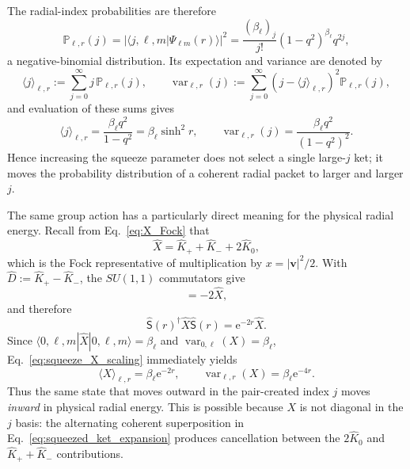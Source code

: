 \documentclass[11pt]{article}
\numberwithin{equation}{section}
\newcommand{\e}{\mathrm e}
\theoremstyle{definition}
\begin{document}
The radial-index probabilities are therefore
\begin{equation}
 \mathbb P_{\ell,r}(j)
 =|\langle j,\ell,m|\Psi_{\ell m}(r)\rangle|^2
 =\frac{(\beta_\ell)_j}{j!}
 (1-q^2)^{\beta_\ell}q^{2j},
 \label{eq:trial_negative_binomial}
\end{equation}
a negative-binomial distribution.  Its expectation and variance are denoted
by
\begin{equation}
 \langle j\rangle_{\ell,r}
 :=\sum_{j=0}^\infty j\,\mathbb P_{\ell,r}(j),
 \qquad
 \operatorname{var}_{\ell,r}(j)
 :=\sum_{j=0}^\infty
 (j-\langle j\rangle_{\ell,r})^2\mathbb P_{\ell,r}(j),
 \label{eq:squeezed_j_moment_definitions}
\end{equation}
and evaluation of these sums gives
\begin{equation}
 \langle j\rangle_{\ell,r}
 =\frac{\beta_\ell q^2}{1-q^2}
 =\beta_\ell\sinh^2 r,
 \qquad
 \operatorname{var}_{\ell,r}(j)
 =\frac{\beta_\ell q^2}{(1-q^2)^2}.
 \label{eq:squeezed_j_moments}
\end{equation}
Hence increasing the squeeze parameter does not select a single large-$j$
ket; it moves the probability distribution of a coherent radial packet to
larger and larger $j$.

The same group action has a particularly direct meaning for the physical
radial energy.  Recall from Eq.~\eqref{eq:X_Fock} that
\begin{equation}
 \widehat X
 =\widehat K_++\widehat K_-+2\widehat K_0,
 \end{equation}
which is the Fock representative of multiplication by $x=|\bm v|^2/2$.
With $\widehat D:=\widehat K_+-\widehat K_-$, the $SU(1,1)$ commutators give
\begin{equation}
 [\widehat D,\widehat X]=-2\widehat X,
\end{equation}
and therefore
\begin{equation}
 \widehat{\mathsf S}(r)^\dagger\widehat X\widehat{\mathsf S}(r)
 =\e^{-2r}\widehat X .
 \label{eq:squeeze_X_scaling}
\end{equation}
Since
$\langle0,\ell,m|\widehat X|0,\ell,m\rangle=\beta_\ell$ and
$\operatorname{var}_{0,\ell}(X)=\beta_\ell$, Eq.~\eqref{eq:squeeze_X_scaling}
immediately yields
\begin{equation}
 \boxed{
 \langle X\rangle_{\ell,r}
 =\beta_\ell\e^{-2r},
 \qquad
 \operatorname{var}_{\ell,r}(X)
 =\beta_\ell\e^{-4r}.
 }
 \label{eq:squeezed_X_moments}
\end{equation}
Thus the same state that moves outward in the pair-created index $j$ moves
\emph{inward} in physical radial energy.  This is possible because $X$ is not
diagonal in the $j$ basis: the alternating coherent superposition in
Eq.~\eqref{eq:squeezed_ket_expansion} produces cancellation between the
$2\widehat K_0$ and $\widehat K_++\widehat K_-$ contributions.
\end{document}
